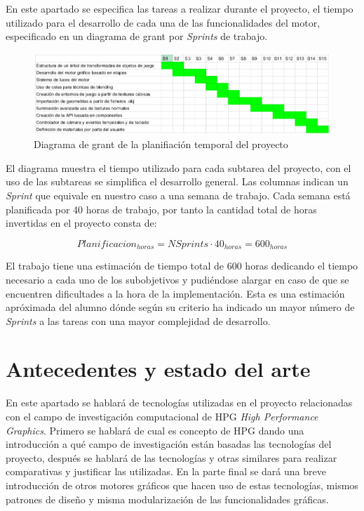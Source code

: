 \documentclass[a4paper]{book}
\begin{document}
En este apartado se especifica las tareas a realizar durante el proyecto, el tiempo utilizado para el desarrollo de cada una
de las funcionalidades del motor, especificado en un diagrama de grant por \textit{Sprints} de trabajo.

\begin{figure}[H]
    \centering
    \includegraphics[width=14cm, keepaspectratio]{img/Schedule.png}
    \caption{Diagrama de grant de la planifiación temporal del proyecto}
    \label{Schedule}
\end{figure}

El diagrama muestra el tiempo utilizado para cada subtarea del proyecto, con el uso de las subtareas se simplifica el
desarrollo general. Las columnas indican un \textit{Sprint} que equivale en nuestro caso a una semana de trabajo. Cada semana
está planificada por 40 horas de trabajo, por tanto la cantidad total de horas invertidas en el proyecto consta de:

\begin{equation} Planificacion_{horas} = NSprints \cdot 40_{horas} = 600_{horas} \end{equation}

El trabajo tiene una estimación de tiempo total de 600 horas dedicando el tiempo necesario a cada uno de los subobjetivos
y pudiéndose alargar en caso de que se encuentren dificultades a la hora de la implementación. Esta es una
estimación apróximada del alumno dónde según su criterio ha indicado un mayor número de \textit{Sprints}
a las tareas con una mayor complejidad de desarrollo.


\cleardoublepage
\chapter{Antecedentes y estado del arte}

En este apartado se hablará de tecnologías utilizadas en el proyecto relacionadas con el campo de investigación
computacional de HPG \textit{High Performance Graphics}. Primero se hablará de cual es concepto de HPG
dando una introducción a qué campo de investigación están basadas las tecnologías del proyecto, después
se hablará de las tecnologías y otras similares para realizar comparativas y justificar las utilizadas. En 
la parte final se dará una breve introducción de otros motores gráficos que hacen uso de estas tecnologías,
mismos patrones de diseño y misma modularización de las funcionalidades gráficas.
\end{document}

